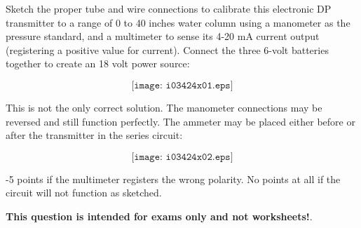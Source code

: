 

Sketch the proper tube and wire connections to calibrate this electronic DP transmitter to a range of 0 to 40 inches water column using a manometer as the pressure standard, and a multimeter to sense its 4-20 mA current output (registering a positive value for current).  Connect the three 6-volt batteries together to create an 18 volt power source:

$$\texttt{[image: i03424x01.eps]}$$







This is not the only correct solution.  The manometer connections may be reversed and still function perfectly.  The ammeter may be placed either before or after the transmitter in the series circuit:

$$\texttt{[image: i03424x02.eps]}$$

-5 points if the multimeter registers the wrong polarity.  No points at all if the circuit will not function as sketched.







{\bf This question is intended for exams only and not worksheets!}.



